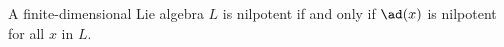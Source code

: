 A finite-dimensional Lie algebra $L$ is nilpotent if and only if $\ad(x)$ is
nilpotent for all $x$ in $L$.
